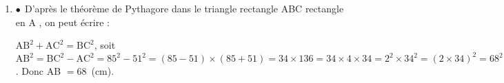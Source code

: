 
\medskip

%
%
%
\begin{enumerate}
\item %
%
%
$\bullet~~$D'après le théorème de Pythagore dans le triangle rectangle ABC rectangle en A , on peut écrire :

$\text{AB}^2 + \text{AC}^2 = \text{BC}^2$, soit $\text{AB}^2 = \text{BC}^2 - \text{AC}^2 = 85^2 - 51^2 = (85 - 51) \times (85 + 51) = 34 \times 136 = 34 \times 4 \times 34 = 2^2 \times 34^2 = (2 \times 34)^2 = 68^2$. Donc AB $ = 68$~(cm).


\end{enumerate}
